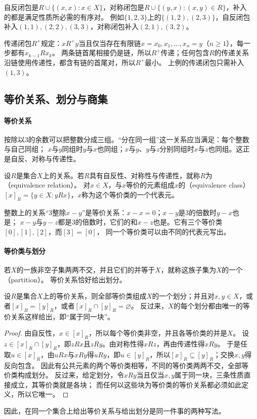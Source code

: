 自反闭包是$R\cup\{(x,x):x\in X\}$，对称闭包是$R\cup\{(y,x):(x,y)\in R\}$，补入的都是满足性质所必需的有序对。
例如$\{1,2,3\}$上的$\{(1,2),(2,3)\}$，自反闭包补入$(1,1),(2,2),(3,3)$，对称闭包补入$(2,1),(3,2)$。

传递闭包$R^+$规定：$xR^+y$当且仅当存在有限链$x=x_0,x_1,\ldots,x_n=y$（$n\geq1$），每一步都有$x_{k-1}Rx_k$。
两条链首尾相接仍是链，所以$R^+$传递；任何包含$R$的传递关系沿链使用传递性，都含有链的首尾对，所以$R^+$最小。
上例的传递闭包只需补入$(1,3)$。

\subsection{等价关系、划分与商集}
\label{sec:prelim-equivalence-relations}

\paragraph{等价关系}
按除以$3$的余数可以把整数分成三组。“分在同一组”这一关系应当满足：每个整数与自己同组；
$x$与$y$同组时$y$与$x$也同组；$x$与$y$、$y$与$z$分别同组时$x$与$z$也同组。这正是自反、对称与传递性。
\begin{definition}[等价关系]
\label{def:prelim-equivalence-relation}
设$R$是集合$X$上的关系。若$R$具有自反性、对称性与传递性，就称$R$为（equivalence relation）。
对$x\in X$，与$x$等价的元素组成$x$的（equivalence class）
$[x]_R=\{y\in X:yRx\}$，$x$称为这个等价类的一个代表元。
\end{definition}
整数上的关系“$3$整除$x-y$”是等价关系：$x-x=0$；$x-y$是$3$的倍数时$y-x$也是；
$x-y$与$y-z$都是$3$的倍数时，它们的和$x-z$也是。它有三个等价类$[0],[1],[2]$，而$[3]=[0]$，
同一个等价类可以由不同的代表元写出。

\paragraph{等价类与划分}
若$X$的一族非空子集两两不交，并且它们的并等于$X$，就称这族子集为$X$的一个（partition）。
等价关系恰好给出划分。
\begin{theorem}[等价类构成划分]
\label{thm:sets-equivalence-partition}
设$R$是集合$X$上的等价关系，则全部等价类组成$X$的一个划分；并且对$x,y\in X$，或者$[x]_R=[y]_R$，或者$[x]_R\cap[y]_R=\varnothing$。
反过来，$X$的每个划分都由唯一的等价关系这样给出，即“属于同一块”。
\end{theorem}
\begin{proof}
由自反性，$x\in[x]_R$，所以每个等价类非空，并且各等价类的并是$X$。
设$z\in[x]_R\cap[y]_R$，即$zRx$且$zRy$。由对称性得$xRz$，再由传递性得$xRy$。
于是任取$u\in[x]_R$，由$uRx$与$xRy$得$uRy$，即$u\in[y]_R$，所以$[x]_R\subseteq[y]_R$；交换$x,y$得反向包含。
因此有公共元素的两个等价类相等，不同的等价类两两不交，全部等价类构成划分。
反过来，给定划分，令$xRy$当且仅当$x,y$属于同一块，三条性质直接成立，其等价类就是各块；
而任何以这些块为等价类的等价关系都必须如此定义，所以它唯一。
\end{proof}
因此，在同一个集合上给出等价关系与给出划分是同一件事的两种写法。

